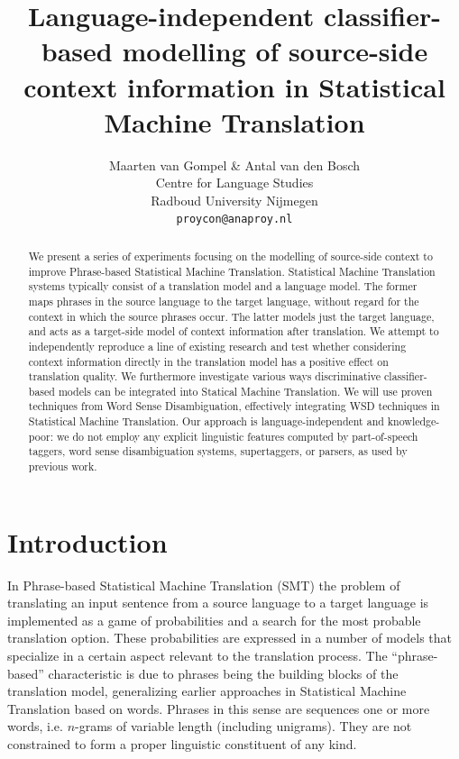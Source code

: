 \documentclass[smallextended]{svjour3}       %
\title{Language-independent classifier-based modelling of source-side context information in Statistical Machine Translation}
\author{Maarten van Gompel \& Antal van den Bosch \\
  Centre for Language Studies \\
  Radboud University Nijmegen \\
  {\tt proycon@anaproy.nl}}
\theoremstyle{break}
\begin{document}
\maketitle

\begin{abstract} 
  We present a series of experiments focusing on the modelling of
  source-side context to improve Phrase-based Statistical Machine
  Translation. Statistical Machine Translation systems typically
  consist of a translation model and a language model. The former maps
  phrases in the source language to the target language, without
  regard for the context in which the source phrases occur. The latter
  models just the target language, and acts as a target-side model of
  context information after translation. We attempt to independently
  reproduce a line of existing research and test whether considering
  context information directly in the translation model has a positive
  effect on translation quality.  We furthermore investigate various
  ways discriminative classifier-based models can be integrated into
  Statical Machine Translation.  We will use proven techniques from
  Word Sense Disambiguation, effectively integrating WSD techniques in
  Statistical Machine Translation. Our approach is
  language-independent and knowledge-poor: we do not employ any
  explicit linguistic features computed by part-of-speech taggers,
  word sense disambiguation systems, supertaggers, or parsers, as used
  by previous work.
\end{abstract}

\section{Introduction}

In Phrase-based Statistical Machine Translation (SMT) the problem of
translating an input sentence from a source language to a target language is
implemented as a game of probabilities and a search for the most probable
translation option.  These probabilities are expressed in a number of models
that specialize in a certain aspect relevant to the translation process. The
``phrase-based'' characteristic is due to phrases being the building blocks of
the translation model, generalizing earlier approaches in
Statistical Machine Translation based on words.  Phrases in this
sense are sequences one or more words, i.e. $n$-grams of variable
length (including unigrams). They are not constrained to form a
proper linguistic constituent of any kind.
\end{document}
